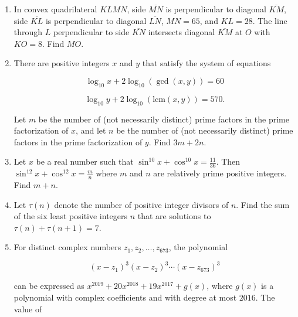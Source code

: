 \documentclass{article}
\begin{document}
\begin{enumerate}[label=\arabic*., itemsep=0.5em]
\vspace{0.5em}\item In convex quadrilateral \(KLMN\), side \(\overline{MN}\) is perpendicular to diagonal \(\overline{KM}\), side \(\overline{KL}\) is perpendicular to diagonal \(\overline{LN}\), \(MN = 65\), and \(KL = 28\). The line through \(L\) perpendicular to side \(\overline{KN}\) intersects diagonal \(\overline{KM}\) at \(O\) with \(KO = 8\). Find \(MO\).\par \vspace{0.5em}\item There are positive integers \(x\) and \(y\) that satisfy the system of equations

\begin{equation*}
\log_{10} x + 2 \log_{10} (\gcd(x,y)) = 60
\end{equation*}
 
\begin{equation*}
\log_{10} y + 2 \log_{10} (\text{lcm}(x,y)) = 570.
\end{equation*}

Let \(m\) be the number of (not necessarily distinct) prime factors in the prime factorization of \(x\), and let \(n\) be the number of (not necessarily distinct) prime factors in the prime factorization of \(y\). Find \(3m+2n\).\par \vspace{0.5em}\item Let \(x\) be a real number such that \(\sin^{10}x+\cos^{10} x = \tfrac{11}{36}\). Then \(\sin^{12}x+\cos^{12} x = \tfrac{m}{n}\) where \(m\) and \(n\) are relatively prime positive integers. Find \(m+n\).\par \vspace{0.5em}\item Let \(\tau(n)\) denote the number of positive integer divisors of \(n\). Find the sum of the six least positive integers \(n\) that are solutions to \(\tau (n) + \tau (n+1) = 7\).\par \vspace{0.5em}\item For distinct complex numbers \(z_1,z_2,\dots,z_{673}\), the polynomial 

\begin{equation*}
(x-z_1)^3(x-z_2)^3 \cdots (x-z_{673})^3
\end{equation*}

can be expressed as \(x^{2019} + 20x^{2018} + 19x^{2017}+g(x)\), where \(g(x)\) is a polynomial with complex coefficients and with degree at most \(2016\). The value of 


\end{enumerate}
\end{document}
